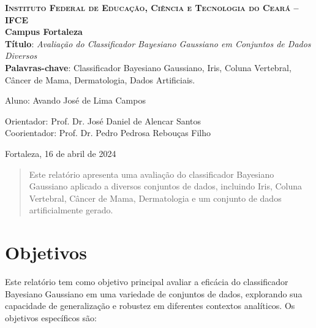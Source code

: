 \documentclass[12pt, a4paper]{report}
\begin{document}
\begin{titlepage}
  \centering
  \Large
  \textsc{\textbf{Instituto Federal de Educação, Ciência e Tecnologia do Ceará -- IFCE}}\\
  \textbf{Campus Fortaleza}\\[2.5cm]
  \LARGE
  \textbf{Título}: \textit{Avaliação do Classificador Bayesiano Gaussiano em Conjuntos de Dados Diversos}\\[1.5cm]
  \textbf{Palavras-chave}: Classificador Bayesiano Gaussiano, Iris, Coluna Vertebral, Câncer de Mama, Dermatologia, Dados Artificiais. \\[3cm]
  \Large

 \begin{minipage}[t][][t]{5cm}
 \end{minipage}
 \begin{minipage}[t][][t]{10cm}
	\begin{flushleft}
   Aluno: Avando José de Lima Campos
  \end{flushleft}
  \end{minipage}

\vspace{1cm}
  \begin{minipage}[t][][t]{5cm}
  \end{minipage}
  \begin{minipage}[t][][t]{14cm}
	\begin{flushleft}
   Orientador: Prof. Dr. José Daniel de Alencar Santos\\ 
   Coorientador: Prof. Dr. Pedro Pedrosa Rebouças Filho
  \end{flushleft}
  \end{minipage}

  \vfill \large
  Fortaleza, 16 de abril de 2024
\end{titlepage}

\begin{abstract}
Este relatório apresenta uma avaliação do classificador Bayesiano Gaussiano aplicado a diversos conjuntos de dados, incluindo Iris, Coluna Vertebral, Câncer de Mama, Dermatologia e um conjunto de dados artificialmente gerado.
\end{abstract}

\tableofcontents
\listoffigures

\chapter{Objetivos}

Este relatório tem como objetivo principal avaliar a eficácia do classificador Bayesiano Gaussiano em uma variedade de conjuntos de dados, explorando sua capacidade de generalização e robustez em diferentes contextos analíticos. Os objetivos específicos são:
\end{document}
